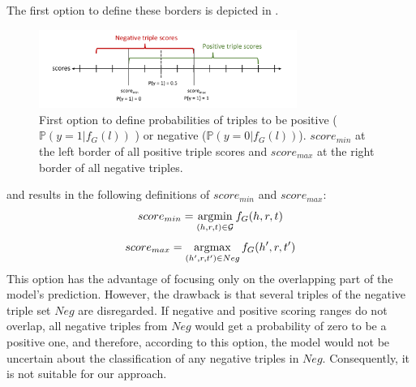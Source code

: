 The first option to define these borders is depicted in .
\begin{figure}[H]
  \centering
    \includegraphics[width=0.75\textwidth]{figures/positives_negatives1.pdf}
  \caption{First option to define probabilities of triples to be positive ($\mathds{P}(y = 1 | f_G(l))$ ) or negative ($\mathds{P}(y = 0 | f_G(l))$). 
  $score_{min}$ at the left border of all positive triple scores and $score_{max}$ at the right border of all negative triples.}
  \label{fig:positives_negatives1}
\end{figure}
and results in the following definitions of  $score_{min}$ and 
$score_{max}$:
\begin{equation} \label{eqn:opt2_score_min}
    score_{min} = \operatorname*{argmin}_{(h,r,t) \in \mathcal{G}}{f_G(h,r,t)}
\end{equation}
\begin{equation} \label{eqn:opt2_score_max}
    score_{max} = \operatorname*{argmax}_{(h',r,t') \in Neg}{f_G(h',r,t')}
\end{equation}
This option has the advantage of focusing only on the overlapping part of the model's prediction.
However, the drawback is that several triples of the negative triple set $Neg$ are disregarded.
If negative and positive scoring ranges do not overlap, all negative triples from $Neg$ would get a probability of zero to be a positive one, and therefore, according to this option, the model would not be uncertain about the classification of any negative triples in $Neg$.
Consequently, it is not suitable for our approach.


